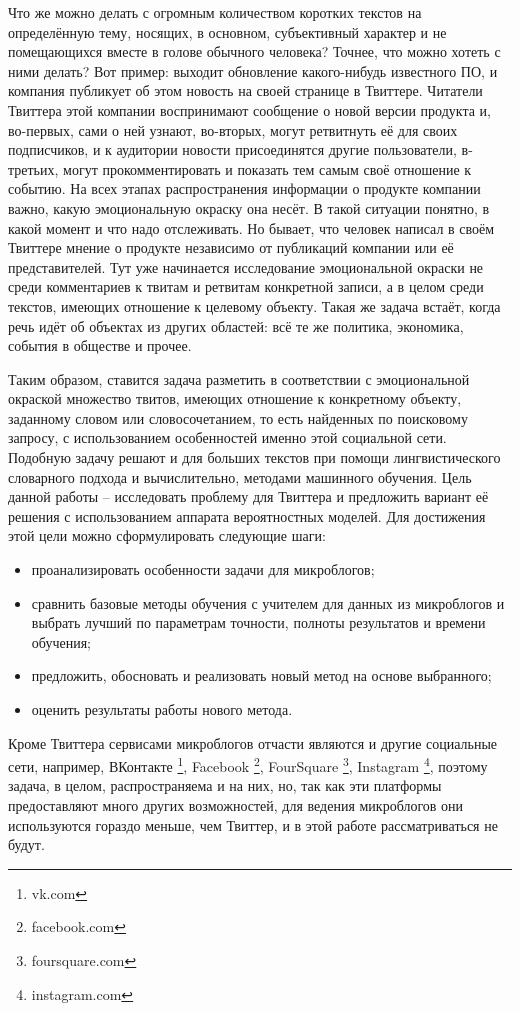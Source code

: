 Что же можно делать с огромным количеством коротких текстов на определённую
тему, носящих, в основном, субъективный характер и не помещающихся вместе
в голове обычного человека? Точнее, что можно хотеть с ними делать? Вот пример:
выходит обновление какого-нибудь известного ПО, и компания публикует об этом
новость на своей странице в Твиттере. Читатели Твиттера этой компании воспринимают
сообщение о новой версии продукта и, во-первых, сами о ней узнают, во-вторых,
могут ретвитнуть её для своих подписчиков, и к аудитории новости присоединятся другие пользователи,
в-третьих, могут прокомментировать и показать тем самым своё отношение к событию.
На всех этапах распространения информации о продукте компании важно, какую
эмоциональную окраску она несёт. В такой ситуации понятно, в какой момент и что
надо отслеживать. Но бывает, что человек написал в своём Твиттере мнение о
продукте независимо от публикаций компании или её представителей. Тут уже
начинается исследование эмоциональной окраски не среди комментариев к твитам и
ретвитам конкретной записи, а в целом среди текстов, имеющих отношение к целевому
объекту. Такая же задача встаёт, когда речь идёт об объектах из других областей:
всё те же политика, экономика, события в обществе и прочее.

Таким образом, ставится задача разметить в соответствии с эмоциональной окраской
множество твитов, имеющих отношение к конкретному объекту, заданному словом или
словосочетанием, то есть найденных по поисковому запросу, с использованием особенностей именно этой социальной сети. Подобную
задачу решают и для больших текстов при помощи лингвистического словарного подхода и
вычислительно, методами машинного обучения. Цель данной работы --
исследовать проблему для Твиттера и предложить вариант её решения с использованием
аппарата вероятностных моделей. Для достижения этой цели можно сформулировать следующие шаги:
\begin{itemize}
\item проанализировать особенности задачи для микроблогов;
\item сравнить базовые методы обучения с учителем для данных из микроблогов и выбрать лучший по
  параметрам точности, полноты результатов и времени обучения;
\item предложить, обосновать и реализовать новый метод на основе выбранного;
\item оценить результаты работы нового метода.
\end{itemize}

Кроме Твиттера сервисами микроблогов отчасти являются и другие социальные сети, например,
ВКонтакте \footnote{vk.com}, Facebook \footnote{facebook.com}, FourSquare \footnote{foursquare.com},
Instagram \footnote{instagram.com}, поэтому задача, в целом, распространяема и на них,
но, так как эти платформы предоставляют много других возможностей, для ведения
микроблогов они используются гораздо меньше, чем Твиттер, и в этой работе
рассматриваться не будут.
